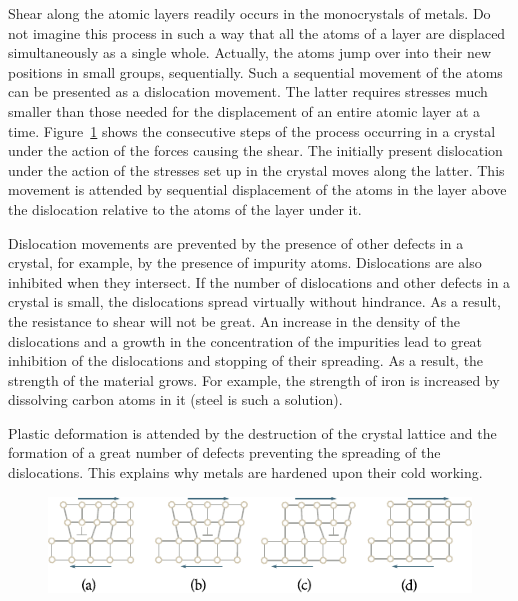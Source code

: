 Shear along the atomic layers readily occurs in the monocrystals of metals. Do not imagine this process in such a way that all the atoms of a layer are displaced simultaneously as a single whole. Actually, the atoms jump over into their new positions in small groups, sequentially. Such a sequential movement of the atoms can be presented as a dislocation movement. The latter requires stresses much smaller than those needed for the displacement of an entire atomic layer at a time. Figure~\ref{fig:13_10} shows the consecutive steps of the process occurring in a crystal under the action of the forces causing the shear. The initially present dislocation under the action of the stresses set up in the crystal moves along the latter. This movement is attended by sequential displacement of the atoms in the layer above the dislocation relative to the atoms of the layer under it.

Dislocation movements are prevented by the presence of other defects in a crystal, for example, by the presence of impurity atoms. Dislocations are also inhibited when they intersect. If the number of dislocations and other defects in a crystal is small, the dislocations spread virtually without hindrance. As a result, the resistance to shear will not be great. An increase in the density of the dislocations and a growth in the concentration of the impurities lead to great inhibition of the dislocations and stopping of their spreading. As a result, the strength of the material grows. For example, the strength of iron is increased by dissolving carbon atoms in it (steel is such a solution).

Plastic deformation is attended by the destruction of the crystal lattice and the formation of a great number of defects preventing the spreading of the dislocations. This explains why metals are hardened upon their cold working.

\begin{figure}[t]
	\begin{center}
		\includegraphics[scale=1.0]{figures/ch_13/fig_13_10.pdf}
		\caption[]{}
		\label{fig:13_10}
	\end{center}
	\vspace{-0.8cm}
\end{figure}

